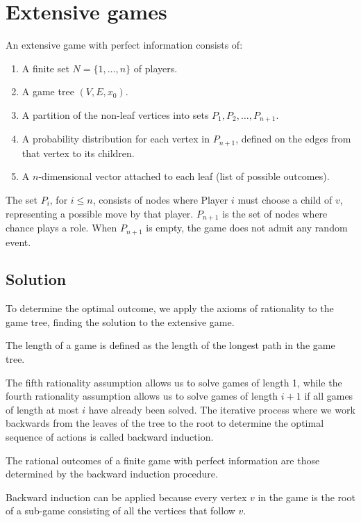 \section{Extensive games}

An extensive game with perfect information consists of:
\begin{enumerate}
    \item A finite set $N = \{1,\dots,n\}$ of players. 
    \item A game tree $(V,E,x_0)$.
    \item A partition of the non-leaf vertices into sets ${P_1, P_2, \dots , P_{n+1}}$.
    \item A probability distribution for each vertex in $P_{n+1}$, defined on the edges from that vertex to its children.
    \item A $n$-dimensional vector attached to each leaf (list of possible outcomes). 
\end{enumerate}
\noindent The set $P_i$, for $i \leq n$, consists of nodes where Player $i$ must choose a child of $v$, representing a possible move by that player.
$P_{n+1}$ is the set of nodes where chance plays a role. 
When $P_{n+1}$ is empty, the game does not admit any random event. 

\subsection{Solution}
To determine the optimal outcome, we apply the axioms of rationality to the game tree, finding the solution to the extensive game. 

\begin{definition}
    The length of a game is defined as the length of the longest path in the game tree.
\end{definition}
\noindent The fifth rationality assumption allows us to solve games of length 1, while the fourth rationality assumption allows us to solve games of length $i + 1$ if all games of length at most $i$ have already been solved.
The iterative process where we work backwards from the leaves of the tree to the root to determine the optimal sequence of actions is called backward induction.
\begin{theorem}
    The rational outcomes of a finite game with perfect information are those determined by the backward induction procedure.
\end{theorem}
Backward induction can be applied because every vertex $v$ in the game is the root of a sub-game consisting of all the vertices that follow $v$. 

